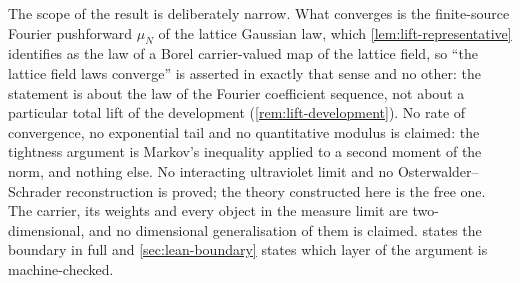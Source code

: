 The scope of the result is deliberately narrow.  What converges is the
finite-source Fourier pushforward $\mu_N$ of the lattice Gaussian law, which
\cref{lem:lift-representative} identifies as the law of a Borel carrier-valued
map of the lattice field, so ``the lattice field laws converge'' is asserted in
exactly that sense and no other: the statement is about the law of the Fourier
coefficient sequence, not about a particular total lift of the development
(\cref{rem:lift-development}).  No rate of convergence,
no exponential tail and no quantitative modulus is claimed: the tightness
argument is Markov's inequality applied to a second moment of the norm, and nothing else.  No
interacting ultraviolet limit and no Osterwalder--Schrader reconstruction is
proved; the theory constructed here is the free one.  The carrier, its weights
and every object in the measure limit are two-dimensional, and no dimensional
generalisation of them is claimed.   states the boundary in full
and \cref{sec:lean-boundary} states which layer of the argument is
machine-checked.
